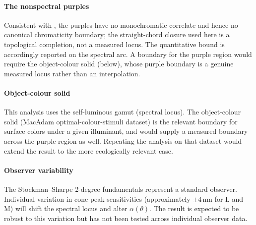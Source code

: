 \documentclass[preprint,12pt,authoryear]{elsarticle}
\theoremstyle{plain}
\theoremstyle{definition}
\theoremstyle{remark}
\begin{document}
\paragraph{The nonspectral purples}
Consistent with , the purples have no monochromatic correlate and hence no canonical chromaticity boundary; the straight-chord closure used here is a topological completion, not a measured locus. The quantitative bound is accordingly reported on the spectral arc. A boundary for the purple region would require the object-colour solid (below), whose purple boundary is a genuine measured locus rather than an interpolation.

\paragraph{Object-colour solid}
This analysis uses the self-luminous gamut (spectral locus). The object-colour solid (MacAdam optimal-colour-stimuli dataset) is the relevant boundary for surface colors under a given illuminant, and would supply a measured boundary across the purple region as well. Repeating the analysis on that dataset would extend the result to the more ecologically relevant case.

\paragraph{Observer variability}
The Stockman--Sharpe 2-degree fundamentals represent a standard observer. Individual variation in cone peak sensitivities (approximately $\pm4$\,nm for L and M) will shift the spectral locus and alter $\alpha(\theta)$. The result is expected to be robust to this variation but has not been tested across individual observer data.
\end{document}
